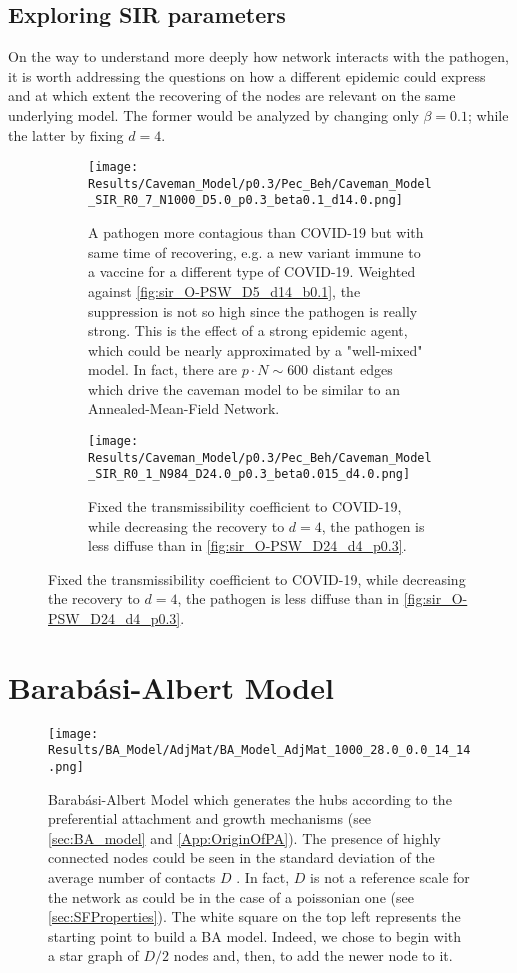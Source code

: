 \documentclass[a4paper,10pt,twoside]{book} %
\theoremstyle{definition}
\begin{document}
\clearpage
\subsection*{Exploring SIR parameters}
On the way to understand more deeply how network interacts with the pathogen, it is worth addressing the questions on how a different epidemic could express and at which extent the recovering of the nodes are relevant on the same underlying model. The former would be analyzed by changing only $\beta = 0.1$; while the latter by fixing $d = 4$.
\begin{figure}[H]
	\centering
	\begin{subfigure}{0.9\linewidth}
		\texttt{[image: Results/Caveman\_Model/p0.3/Pec\_Beh/Caveman\_Model\_SIR\_R0\_7\_N1000\_D5.0\_p0.3\_beta0.1\_d14.0.png]}
		\caption{A pathogen more contagious than COVID-19 but with same time of recovering, e.g. a new variant immune to a vaccine for a different type of COVID-19. Weighted against \autoref{fig:sir_O-PSW_D5_d14_b0.1}, the suppression is not so high since the pathogen is really strong. This is the effect of a strong epidemic agent, which could be nearly approximated by a "well-mixed" model. In fact, there are $p \cdot N \sim 600$ distant edges which drive the caveman model to be similar to an Annealed-Mean-Field Network.}
		\label{fig:sir_CM_D4_p0.3_OR1_b0.1}
	\end{subfigure}
	\par\bigskip
	\centering
	\begin{subfigure}{0.9\linewidth}
		\texttt{[image: Results/Caveman\_Model/p0.3/Pec\_Beh/Caveman\_Model\_SIR\_R0\_1\_N984\_D24.0\_p0.3\_beta0.015\_d4.0.png]}
		\caption{Fixed the transmissibility coefficient to COVID-19, while decreasing the recovery to $d = 4$, the pathogen is less diffuse than in \autoref{fig:sir_O-PSW_D24_d4_p0.3}.}
		\label{fig:sir_CM_D23_d4_p0.3}
	\end{subfigure}
\end{figure}

\clearpage
\section{Barabási-Albert Model}
\label{sec:res_BA}
\begin{figure}[t]
	\centering
	\texttt{[image: Results/BA\_Model/AdjMat/BA\_Model\_AdjMat\_1000\_28.0\_0.0\_14\_14.png]}
	\caption{Barabási-Albert Model which generates the hubs according to the preferential attachment and growth mechanisms (see \autoref{sec:BA_model} and \autoref{App:OriginOfPA}). The presence of highly connected nodes could be seen in the standard deviation of the average number of contacts $ D$ . In fact, $ D$ is not a reference scale for the network as could be in the case of a poissonian one (see \autoref{sec:SFProperties}). The white square on the top left represents the starting point to build a BA model. Indeed, we chose to begin with a star graph of $D/2$ nodes and, then, to add the newer node to it.}
	\label{fig:BA_model_Network}
\end{figure}
\end{document}
